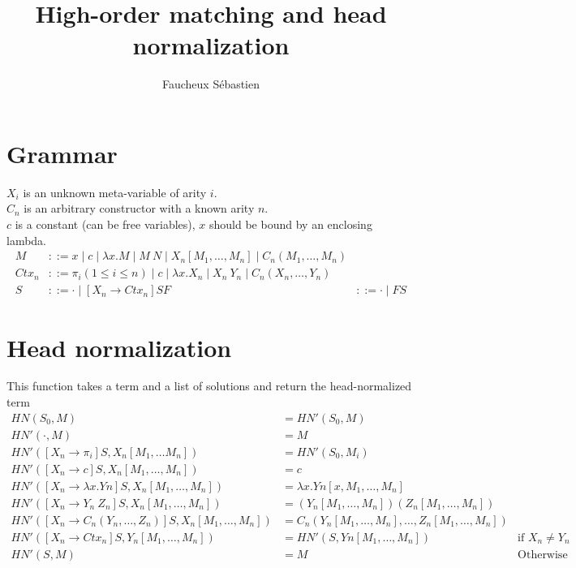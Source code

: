 \documentclass{article}
\newcommand{\ifm}[1]{\text{if $#1$}}
\newcommand\HN{\mathit{HN}}
\begin{document}
\title{ High-order matching and head normalization }

\author{Faucheux Sébastien}
\maketitle
\section{Grammar}
$X_i$ is an unknown meta-variable of arity $i$.\\
$C_n$ is an arbitrary constructor with a known arity $n$.\\
$c$ is a constant (can be free variables), $x$ should be bound by an enclosing lambda.\\
\begin{align*}
M &::= x \mid c \mid \lambda x.M \mid M\ N \mid X_n[M_1, \ldots, M_n] \mid C_n(M_1,\dots, M_n)\\
\mathit{Ctx}_n &::= \pi_i (1 \leq i \leq n) \mid c \mid \lambda x.X_n \mid X_n\ Y_n \mid C_n(X_n,\dots, Y_n)\\
S &::= \cdot \mid [X_n \rightarrow \mathit{Ctx}_n]S
F &::= \cdot \mid F S
\end{align*}
\section{Head normalization}
This function takes a term and a list of solutions and return the head-normalized term
\begin{align*}
\HN(S_0, M) &= \HN'(S_0, M)\\
\HN'(\cdot, M) &= M\\
\HN'([X_n \rightarrow \pi_i]S, X_n[M_1, \ldots M_n]) &= \HN'(S_0, M_i)\\
\HN'([X_n \rightarrow c]S, X_n[M_1,\ldots ,M_n]) &= c\\
\HN'([X_n \rightarrow \lambda x.Yn]S, X_n[M_1,\ldots ,M_n]) &= \lambda x.Yn[x, M_1,\ldots ,M_n]\\
\HN'([X_n \rightarrow Y_n\ Z_n]S, X_n[M_1,\ldots ,M_n]) &= (Y_n[M_1,\ldots ,M_n]) (Z_n[M_1,\ldots ,M_n])\\
\HN'([X_n \rightarrow C_n(Y_n, \dots, Z_n)]S, X_n[M_1,\ldots ,M_n]) &= C_n(Y_n[M_1,\ldots ,M_n],\dots,Z_n[M_1,\ldots ,M_n])\\
\HN'([X_n \rightarrow \mathit{Ctx}_n]S, Y_n[M_1,\ldots ,M_n]) &= \HN'(S,Yn[M_1,\ldots ,M_n]) &\ifm{X_n \neq Y_n}\\
    \HN'(S, M) &= M &\text{Otherwise}
\end{align*}
\end{document}
